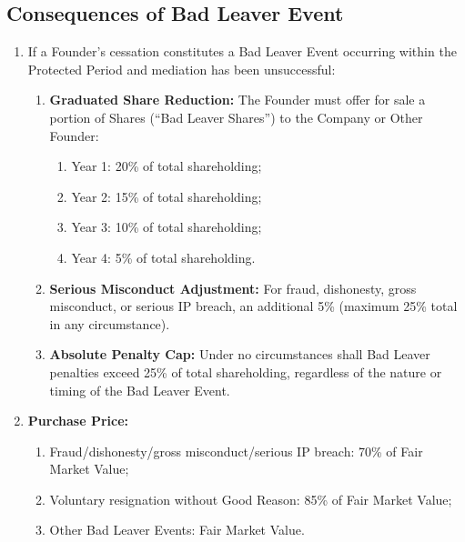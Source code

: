 \subsection{Consequences of Bad Leaver Event}
\begin{enumerate}[label=(\alph*)]
\item If a Founder's cessation constitutes a Bad Leaver Event occurring within the Protected Period and mediation has been unsuccessful:
    \begin{enumerate}[label=(\roman*)]
    \item \textbf{Graduated Share Reduction:} The Founder must offer for sale a portion of Shares (``Bad Leaver Shares'') to the Company or Other Founder:
        \begin{enumerate}[label=(\alph*)]
        \item Year 1: 20\% of total shareholding;
        \item Year 2: 15\% of total shareholding;
        \item Year 3: 10\% of total shareholding;
        \item Year 4: 5\% of total shareholding.
        \end{enumerate}
    \item \textbf{Serious Misconduct Adjustment:} For fraud, dishonesty, gross misconduct, or serious IP breach, an additional 5\% (maximum 25\% total in any circumstance).
    \item \textbf{Absolute Penalty Cap:} Under no circumstances shall Bad Leaver penalties exceed 25\% of total shareholding, regardless of the nature or timing of the Bad Leaver Event.
    \end{enumerate}

\item \textbf{Purchase Price:}
    \begin{enumerate}[label=(\roman*)]
    \item Fraud/dishonesty/gross misconduct/serious IP breach: 70\% of Fair Market Value;
    \item Voluntary resignation without Good Reason: 85\% of Fair Market Value;
    \item Other Bad Leaver Events: Fair Market Value.
    \end{enumerate}


\end{enumerate}
